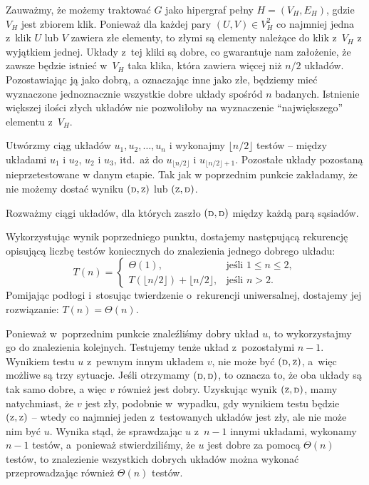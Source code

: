 Zauważmy, że możemy traktować $G$ jako hipergraf pełny $H=(V_H,E_H)$, gdzie $V_H$ jest zbiorem klik. Ponieważ dla każdej pary $(U,V)\in V_H^2$ co najmniej jedna z~klik $U$ lub $V$ zawiera złe elementy, to złymi są elementy należące do klik z~$V_H$ z wyjątkiem jednej. Układy z~tej kliki są dobre, co gwarantuje nam założenie, że zawsze będzie istnieć w~$V_H$ taka klika, która zawiera więcej niż $n/2$ układów. Pozostawiając ją jako dobrą, a oznaczając inne jako złe, będziemy mieć wyznaczone jednoznacznie wszystkie dobre układy spośród $n$ badanych. Istnienie większej ilości złych układów nie pozwoliłoby na wyznaczenie ``największego'' elementu z~$V_H$.

\subproblem %
Utwórzmy \wrong ciąg układów $u_1,u_2,\dots,u_n$ i wykonajmy $\lfloor n/2\rfloor$ testów -- między układami $u_1$ i $u_2$, $u_2$ i $u_3$, itd.\ aż do $u_{\lfloor n/2\rfloor}$ i $u_{\lfloor n/2\rfloor+1}$. Pozostałe układy pozostaną nieprzetestowane w danym etapie. Tak jak w poprzednim punkcie zakładamy, że nie możemy dostać wyniku $({\scriptstyle\rm D},{\scriptstyle\rm Z})$ lub $({\scriptstyle\rm Z},{\scriptstyle\rm D})$.

Rozważmy ciągi układów, dla których zaszło $({\scriptstyle\rm D},{\scriptstyle\rm D})$ między każdą parą sąsiadów. 

\subproblem %
Wykorzystując wynik poprzedniego punktu, dostajemy następującą rekurencję opisującą liczbę testów koniecznych do znalezienia jednego dobrego układu:
\[
	T(n) =
	\begin{cases}
		\Theta(1), & \text{jeśli $1\le n\le2$}, \\
		T(\lfloor n/2\rfloor) + \lfloor n/2\rfloor, & \text{jeśli $n>2$}.
	\end{cases}
\]
Pomijając podłogi i~stosując twierdzenie o~rekurencji uniwersalnej, dostajemy jej rozwiązanie: $T(n)=\Theta(n)$.

Ponieważ w~poprzednim punkcie znaleźliśmy dobry układ $u$, to wykorzystajmy go do znalezienia kolejnych. Testujemy tenże układ z~pozostałymi $n-1$. Wynikiem testu $u$ z~pewnym innym układem $v$, nie może być $({\scriptstyle\rm D},{\scriptstyle\rm Z})$, a~więc możliwe są trzy sytuacje. Jeśli otrzymamy $({\scriptstyle\rm D},{\scriptstyle\rm D})$, to oznacza to, że oba układy są tak samo dobre, a więc $v$ również jest dobry. Uzyskując wynik $({\scriptstyle\rm Z},{\scriptstyle\rm D})$, mamy natychmiast, że $v$ jest zły, podobnie w~wypadku, gdy wynikiem testu będzie $({\scriptstyle\rm Z},{\scriptstyle\rm Z})$ -- wtedy co najmniej jeden z~testowanych układów jest zły, ale nie może nim być $u$. Wynika stąd, że sprawdzając $u$ z~$n-1$ innymi układami, wykonamy $n-1$ testów, a~ponieważ stwierdziliśmy, że $u$ jest dobre za pomocą $\Theta(n)$ testów, to znalezienie wszystkich dobrych układów można wykonać przeprowadzając również $\Theta(n)$ testów.

